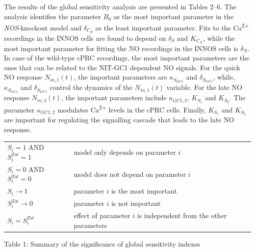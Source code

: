 \documentclass[
  11pt,
  letterpaper,
  DIV=11,
  numbers=noendperiod]{scrartcl}
\newcounter{none} %
\begin{document}
The results of the global sensitivity analysis are presented in Tables
2--6. The analysis identifies the parameter \(B_0\) as the most
important parameter in the \emph{NOS}-knockout model and
\(\delta_{C_P}\) as the least important parameter. Fits to the
Ca\textsuperscript{2+} recordings in the INNOS cells are found to depend
on \(\delta_S\) and \(K_{C_N}\), while the most important parameter for
fitting the NO recordings in the INNOS cells is \(\delta_N\). In case of
the wild-type cPRC recordings, the most important parameters are the
ones that can be related to the NIT-GC1 dependent NO signals. For the
quick NO response \(N_{in,1}(t)\), the important parameters are
\(\kappa_{S_{GC1}}\) and \(\delta_{S_{GC1}}\), while,
\(\kappa_{S_{GC1}}\) and \(\delta_{S_{GC1}}\) control the dynamics of
the \(N_{in,1}(t)\) variable. For the late NO response \(N_{in,2}(t)\),
the important parameters include \(\kappa_{GC1,2}\), \(K_{S_1}\) and
\(K_{S_2}\). The parameter \(\kappa_{GC1,2}\) modulates
Ca\textsuperscript{2+} levels in the cPRC cells. Finally, \(K_{S_1}\)
and \(K_{S_2}\) are important for regulating the signalling cascade that
leads to the late NO response.

{\def\LTcaptype{none} %
\begin{longtable}[]{@{}
  >{\raggedright\arraybackslash}p{}
  >{\raggedright\arraybackslash}p{}@{}}
\toprule\noalign{}
\endhead
\bottomrule\noalign{}
\endlastfoot
\(S_i=1\) AND \(S_i^{Tot}=1\) & model only depends on parameter \(i\) \\
\(S_i=0\) AND \(S_i^{Tot}=0\) & model does not depend on parameter
\(i\) \\
\(S_i \rightarrow 1\) & parameter \(i\) is the most important \\
\(S_i^{Tot} \rightarrow 0\) & parameter \(i\) is not important \\
\(S_i=S_i^{Tot}\) & effect of parameter \(i\) is independent from the
other parameters \\
\end{longtable}
}

Table 1: Summary of the significance of global sensitivity indexes
\end{document}
